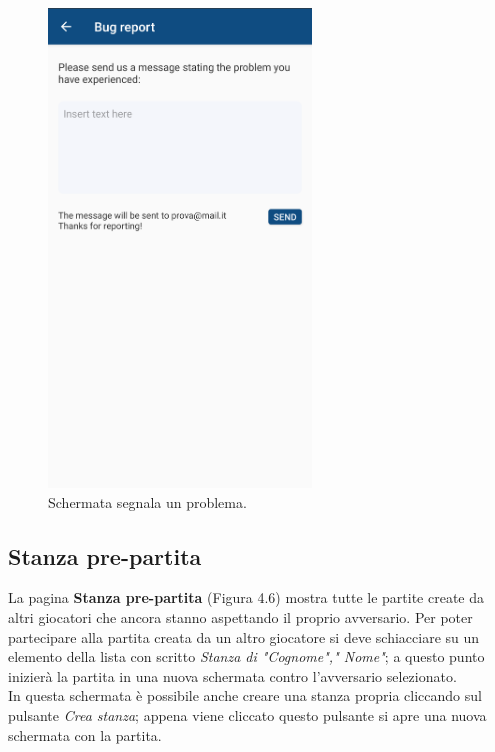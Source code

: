 \documentclass[a4paper,11pt,twoside,openright]{report}
\begin{document}
\begin{figure}[h]
\centering
\includegraphics[width=\linewidth,height=360pt,keepaspectratio]{images/BugReport.png}
\caption{Schermata segnala un problema.}
\end{figure}

\subsection{Stanza pre-partita}
La pagina \textbf{Stanza pre-partita} (Figura 4.6) mostra tutte le partite create da altri giocatori che ancora stanno aspettando il proprio avversario. Per poter partecipare alla partita creata da un altro
giocatore si deve schiacciare su un elemento della lista con scritto \textit{Stanza di "Cognome"," Nome"}; a questo punto inizierà la partita in una nuova schermata contro l'avversario selezionato.\\
In questa schermata è possibile anche creare una stanza propria cliccando sul pulsante \textit{Crea stanza}; appena viene cliccato questo pulsante si apre una nuova schermata con la partita.
\end{document}
